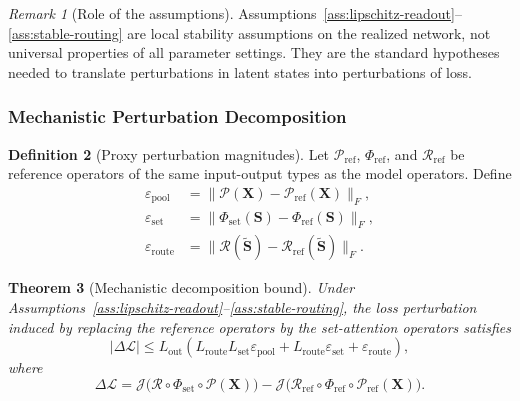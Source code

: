 \documentclass{article}
\theoremstyle{plain}
\newtheorem{theorem}{Theorem}[section]
\theoremstyle{definition}
\newtheorem{definition}[theorem]{Definition}
\theoremstyle{remark}
\newtheorem{remark}[theorem]{Remark}
\begin{document}
\begin{remark}[Role of the assumptions]
\label{rem:regularity-assumptions}
Assumptions~\ref{ass:lipschitz-readout}--\ref{ass:stable-routing} are local stability assumptions on the realized network, not universal properties of all parameter settings. They are the standard hypotheses needed to translate perturbations in latent states into perturbations of loss.
\end{remark}

\subsubsection{Mechanistic Perturbation Decomposition}
\label{sec:tier-b-mechanistic}

\begin{definition}[Proxy perturbation magnitudes]
\label{def:proxy-perturbations}
Let $\mathcal{P}_{\mathrm{ref}}$, $\Phi_{\mathrm{ref}}$, and $\mathcal{R}_{\mathrm{ref}}$ be reference operators of the same input-output types as the model operators. Define
\begin{align}
\label{eq:eps-pool}
\varepsilon_{\mathrm{pool}}
&=
\|\mathcal{P}(\mathbf{X})-\mathcal{P}_{\mathrm{ref}}(\mathbf{X})\|_F,
\\
\label{eq:eps-set}
\varepsilon_{\mathrm{set}}
&=
\|\Phi_{\mathrm{set}}(\mathbf{S})-\Phi_{\mathrm{ref}}(\mathbf{S})\|_F,
\\
\label{eq:eps-route}
\varepsilon_{\mathrm{route}}
&=
\|\mathcal{R}(\tilde{\mathbf{S}})-\mathcal{R}_{\mathrm{ref}}(\tilde{\mathbf{S}})\|_F.
\end{align}
\end{definition}

\begin{theorem}[Mechanistic decomposition bound]
\label{thm:mechanistic-decomposition}
Under Assumptions~\ref{ass:lipschitz-readout}--\ref{ass:stable-routing}, the loss perturbation induced by replacing the reference operators by the set-attention operators satisfies
\begin{equation}
\label{eq:mechanistic-decomposition-bound}
|\Delta \mathcal{L}|
\le
L_{\mathrm{out}}
\left(
L_{\mathrm{route}}L_{\mathrm{set}}\varepsilon_{\mathrm{pool}}
+
L_{\mathrm{route}}\varepsilon_{\mathrm{set}}
+
\varepsilon_{\mathrm{route}}
\right),
\end{equation}
where
\[
\Delta \mathcal{L}
=
\mathcal J\bigl(\mathcal{R}\circ \Phi_{\mathrm{set}}\circ \mathcal{P}(\mathbf{X})\bigr)
-
\mathcal J\bigl(\mathcal{R}_{\mathrm{ref}}\circ \Phi_{\mathrm{ref}}\circ \mathcal{P}_{\mathrm{ref}}(\mathbf{X})\bigr).
\]
\end{theorem}
\end{document}
